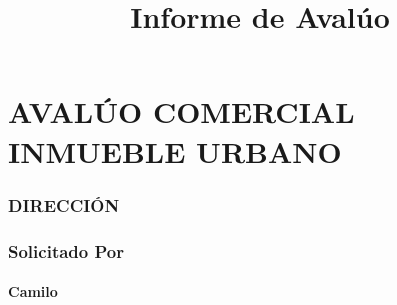 \documentclass[12pt,a4paper,twoside]{article}
\author{}
\title{Informe de Avalúo}
\begin{document}
	


\newcommand{\Direccion}[1]{}
\newcommand{\VeredaBarrio}[1]{Comuneros}
\newcommand{\Municipio}[1]{Bucaramanga}
\newcommand{\Departamento}[1]{Santander}
\newcommand{\Propietarios}[1]{COLOMBIA TELECOMUNICACIONES S.A E.S.P BIC}
\newcommand{\Matricula}[1]{300-17810}
\newcommand{\EscrituraAportada}[1]{Copia simple de la Escritura Publica No. 4126 del 26 de Noviembre de 1997, otorgada en la Notaria 2 de Bucaramanga.}
\newcommand{\DocAdquisicion}[1]{Copia simple de la Escritura Publica No. 4126 del 26 de Noviembre de 1997, otorgada en la Notaria 2 de Bucaramanga.}
\newcommand{\RPH}[1]{No aplica}
\part*{AVALÚO COMERCIAL INMUEBLE URBANO}

\bigskip 
\bigskip 
\bigskip 
\bigskip 
\bigskip 
\bigskip 

\section*{DIRECCIÓN}

\subsection*{\Direccion}
\subsection*{\VeredaBarrio}
\subsection*{\Municipio}
\subsection*{\Departamento}

\bigskip 
\bigskip 
\bigskip 
\bigskip 
\bigskip 
\bigskip 

\section*{Solicitado Por}

\subsection*{Camilo}
\end{document}

